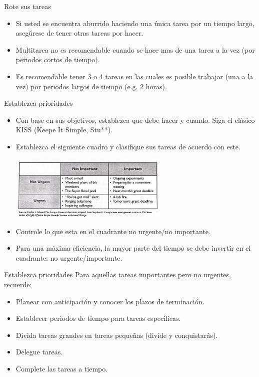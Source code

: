 \documentclass[
10pt,
aspectratio=169,
]{beamer}
\begin{document}
\begin{frame}[c]{Rote sus tareas}
\begin{itemize}
\item Si usted se encuentra aburrido haciendo una \'unica tarea por un tiempo largo, asegúrese de tener otras tareas por hacer.
\item Multitarea no es recomendable cuando se hace mas de una tarea a la vez (por periodos cortos de tiempo).
\item Es recomendable tener 3 o 4 tareas en las cuales es posible trabajar (una a la vez) por periodos largos de tiempo (e.g. 2 horas).
\end{itemize}
\end{frame}

\begin{frame}[c]{Establezca prioridades}
\begin{itemize}
\item Con base en sus objetivos, establezca que debe hacer y cuando. Siga el cl\'asico \alert{KISS} (Keepe It Simple, Stu**). 
\item Establezca el siguiente cuadro y clasifique sus tareas de acuerdo con este.
\begin{center}
\includegraphics[width=0.6\textwidth]{imUr.jpeg}
\end{center}
\item Controle lo que esta en el cuadrante no urgente/no importante.
\item \alert{Para una m\'axima eficiencia, la mayor parte del tiempo se debe invertir en el cuadrante: no urgente/importante.}
\end{itemize}
\end{frame}

\begin{frame}[c]{Establezca prioridades}
Para aquellas tareas importantes pero no urgentes, recuerde:
\begin{itemize}
\item Planear con anticipaci\'on y conocer los plazos de terminaci\'on.
\item Establecer periodos de tiempo para tareas especificas.
\item Divida tareas grandes en tareas peque\~nas (divide y conquistar\'as).
\item Delegue tareas.
\item Complete las tareas a tiempo. 
\end{itemize}
\end{frame}
\end{document}

